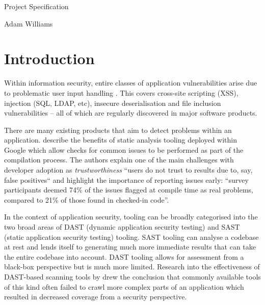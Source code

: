 \documentclass[a4paper]{article}
\begin{document}
\begin{titlepage}
    {\par}
    \vspace{1.25cm}
    \vspace{3.5cm}
    {\hspace{0.75cm}\Huge \sffamily Project Specification}
    \vspace{0.16cm}
    {\par}
    {\hspace{0.75cm}\large \sffamily Adam Williams}
    \vfill
\end{titlepage}
\restoregeometry
\restorepagecolor
    
    \section*{Introduction}
    
    Within information security, entire classes of application vulnerabilities arise due to problematic user input handling \citep{christey2007vulnerability}. This covers cross-site scripting (XSS), injection (SQL, LDAP, etc), insecure
    deserialisation and file inclusion vulnerabilities -- all of which are regularly discovered in major software products.
    
    There are many existing products that aim to detect problems within an application. \citet{Sadowski:2018:LBS:3200906.3188720} describe the benefits of static analysis tooling deployed within Google which allow checks for common issues to be performed as part of the compilation process. The authors explain one of the main challenges with developer adoption as \emph{trustworthiness} ``users do not trust to results due to, say, false positives`` and highlight the importance of reporting issues early: ``survey participants deemed 74\% of the issues flagged at compile time as real problems, compared to 21\% of those found in checked-in code''.
    
    In the context of application security, tooling can be broadly categorised into the two broad areas of DAST (dynamic application security testing) and SAST (static application security testing) tooling. SAST tooling can analyse a codebase at rest and lends itself to generating much more immediate results that can take the entire codebase into account. DAST tooling allows for assessment from a black-box perspective but is much more limited. Research into the effectiveness of DAST-based scanning tools by \citet{doupe2010johnny} drew the conclusion that commonly available tools of this kind often failed to crawl more complex parts of an application which resulted in decreased coverage from a security perspective.
    
\end{document}

